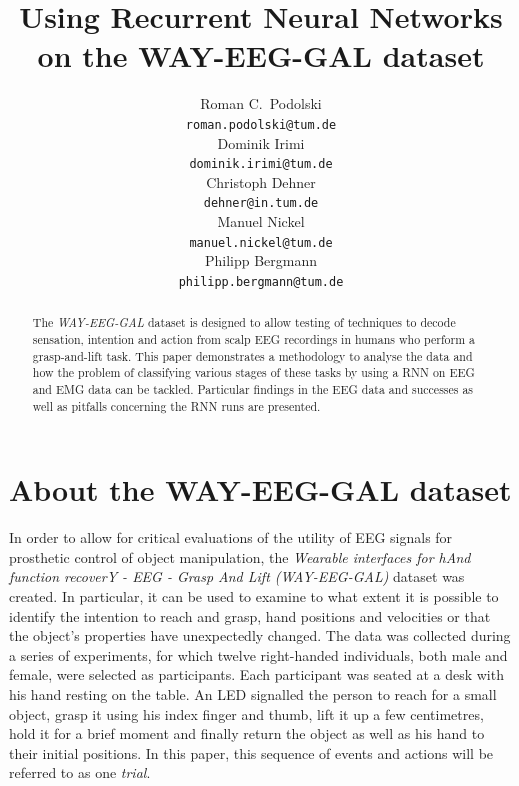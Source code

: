 \documentclass{article} %
\title{Using Recurrent Neural Networks on the WAY-EEG-GAL dataset}
\author{
Roman C.~Podolski
\\
\texttt{roman.podolski@tum.de} \\
\And
Dominik Irimi \\
\texttt{dominik.irimi@tum.de} \\
\AND
Christoph Dehner \\
\texttt{dehner@in.tum.de} \\
\And
Manuel Nickel \\
\texttt{manuel.nickel@tum.de} \\
\And
Philipp Bergmann \\
\texttt{philipp.bergmann@tum.de} \\
}
\begin{document}
\maketitle

\begin{abstract}
The \emph{WAY-EEG-GAL} dataset is designed to allow testing of techniques to decode sensation, intention and action from scalp EEG recordings in humans who perform a grasp-and-lift task.
This paper demonstrates a methodology to analyse the data and how the problem of classifying various stages of these tasks by using a RNN on EEG and EMG data can be tackled.
Particular findings in the EEG data and successes as well as pitfalls concerning the RNN runs are presented.
\end{abstract}

\section{About the WAY-EEG-GAL dataset}\label{sec:data}
In order to allow for critical evaluations of the utility of EEG signals for prosthetic control of object manipulation, the \emph{Wearable interfaces for hAnd function recoverY - EEG - Grasp And Lift (WAY-EEG-GAL)} dataset was created. In particular, it can be used to examine to what extent it is possible to identify the intention to reach and grasp, hand positions and velocities or that the object's properties have unexpectedly changed. The data was collected during a series of experiments, for which twelve right-handed individuals, both male and female, were selected as participants. Each participant was seated at a desk with his hand resting on the table. An LED signalled the person to reach for a small object, grasp it using his index finger and thumb, lift it up a few centimetres, hold it for a brief moment and finally return the object as well as his hand to their initial positions. In this paper, this sequence of events and actions will be referred to as one \emph{trial}.
\end{document}
